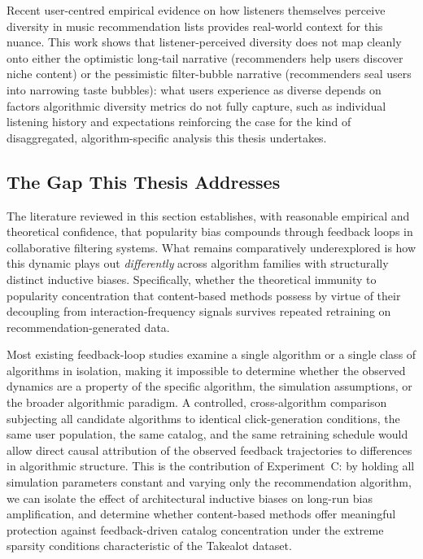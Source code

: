 \documentclass[11pt,a4paper]{report}
\begin{document}
Recent user-centred empirical evidence on how listeners themselves perceive diversity in music recommendation lists \citep{robinson2020userinsights} provides real-world context for this nuance. This work shows that listener-perceived diversity does not map cleanly onto either the optimistic long-tail narrative (recommenders help users discover niche content) or the pessimistic filter-bubble narrative (recommenders seal users into narrowing taste bubbles): what users experience as diverse depends on factors algorithmic diversity metrics do not fully capture, such as individual listening history and expectations reinforcing the case for the kind of disaggregated, algorithm-specific analysis this thesis undertakes.

\subsection*{The Gap This Thesis Addresses}

The literature reviewed in this section establishes, with reasonable empirical and theoretical confidence, that popularity bias compounds through feedback loops in collaborative filtering systems. What remains comparatively underexplored is how this dynamic plays out \emph{differently} across algorithm families with structurally distinct inductive biases. Specifically, whether the theoretical immunity to popularity concentration that content-based methods possess by virtue of their decoupling from interaction-frequency signals survives repeated retraining on recommendation-generated data.

Most existing feedback-loop studies examine a single algorithm or a single class of algorithms in isolation, making it impossible to determine whether the observed dynamics are a property of the specific algorithm, the simulation assumptions, or the broader algorithmic paradigm. A controlled, cross-algorithm comparison subjecting all candidate algorithms to identical click-generation conditions, the same user population, the same catalog, and the same retraining schedule would allow direct causal attribution of the observed feedback trajectories to differences in algorithmic structure. This is the contribution of Experiment~C: by holding all simulation parameters constant and varying only the recommendation algorithm, we can isolate the effect of architectural inductive biases on long-run bias amplification, and determine whether content-based methods offer meaningful protection against feedback-driven catalog concentration under the extreme sparsity conditions characteristic of the Takealot dataset.
\end{document}
